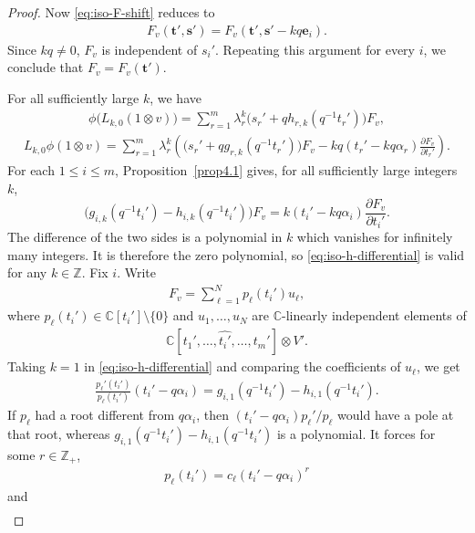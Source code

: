 \documentclass[a4paper]{amsart}
\numberwithin{equation}{section}
\begin{document}
\begin{proof}
Now \eqref{eq:iso-F-shift} reduces to
\begin{align*}
F_v(\mathbf t',\mathbf s')
=F_v(\mathbf t',\mathbf s'-kq\mathbf e_i).
\end{align*}
Since $kq\neq0$, $F_v$ is independent of $s_i'$. Repeating this
argument for every $i$, we conclude that $F_v=F_v(\mathbf t')$.

For all sufficiently large $k$,  we have
\begin{align*}
\phi\bigl(L_{k,0}(1\otimes v)\bigr)
=\sum_{r=1}^m\lambda_r^k
\bigl(s_r'+qh_{r,k}(q^{-1}t_r')\bigr)F_v,
\end{align*}
\begin{align*}
L_{k,0}\phi(1\otimes v)
=\sum_{r=1}^m\lambda_r^k
\left(\bigl(s_r'+qg_{r,k}(q^{-1}t_r')\bigr)F_v
-kq(t_r'-kq\alpha_r)\frac{\partial F_v}{\partial t_r'}\right).
\end{align*}
For each $1\leq i\leq m$, Proposition~\ref{prop4.1} gives, for all
sufficiently large integers $k$,
\begin{equation}\label{eq:iso-h-differential}
\bigl(g_{i,k}(q^{-1}t_i')-h_{i,k}(q^{-1}t_i')\bigr)F_v
=k(t_i'-kq\alpha_i)\frac{\partial F_v}{\partial t_i'}.
\end{equation}
The difference of the two sides is a polynomial in $k$ which vanishes
for infinitely many integers. It is therefore the zero polynomial, so
\eqref{eq:iso-h-differential} is valid for any $k\in\mathbb{Z}$. Fix $i$. Write
\begin{align*}
F_v=\sum_{\ell=1}^N p_\ell(t_i')u_\ell,
\end{align*}
where $p_\ell(t_i')\in\mathbb C[t_i']\setminus\{0\}$ and $u_1,\ldots,u_N$ are $\mathbb C$-linearly independent
elements of
\begin{align*}
\mathbb C[t_1',\ldots,\widehat{t_i'},\ldots,t_m']\otimes V'.
\end{align*}
Taking $k=1$ in \eqref{eq:iso-h-differential} and
comparing the coefficients of $u_\ell$, we get
\begin{align*}
\frac{p_\ell'(t_i')}{p_\ell(t_i')}(t_i'-q\alpha_i)
=g_{i,1}(q^{-1}t_i')-h_{i,1}(q^{-1}t_i').
\end{align*}
If $p_\ell$ had a root different from $q\alpha_i$, then
$(t_i'-q\alpha_i)p_\ell'/p_\ell$ would have a pole at that root, whereas
$g_{i,1}(q^{-1}t_i')-h_{i,1}(q^{-1}t_i')$ is a polynomial. It forces for some $r\in\mathbb Z_+$,
\begin{align*}
p_\ell(t_i')=c_\ell(t_i'-q\alpha_i)^r
\end{align*}
and
\begin{align*}

\end{align*}
\end{proof}
\end{document}
